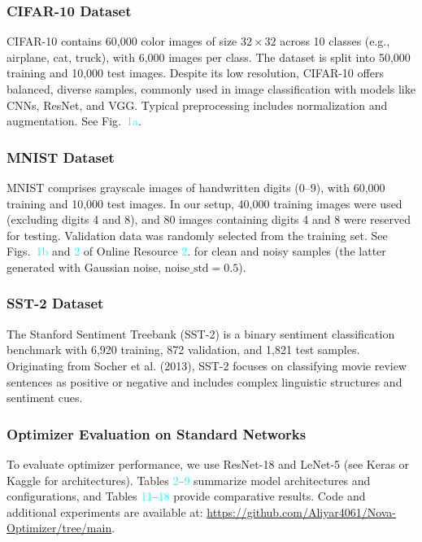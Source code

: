 \documentclass[10pt,twocolumn]{article}
\begin{document}
\subsubsection{CIFAR-10 Dataset}

CIFAR-10 contains 60,000 color images of size $32\times32$ across 10 classes (e.g., airplane, cat, truck), with 6,000 images per class. The dataset is split into 50,000 training and 10,000 test images. Despite its low resolution, CIFAR-10 offers balanced, diverse samples, commonly used in image classification with models like CNNs, ResNet, and VGG. Typical preprocessing includes normalization and augmentation. See Fig.~\textcolor{cyan}{1a}.

\subsubsection{MNIST Dataset}

MNIST comprises grayscale images of handwritten digits (0–9), with 60,000 training and 10,000 test images. In our setup, 40,000 training images were used (excluding digits 4 and 8), and 80 images containing digits 4 and 8 were reserved for testing. Validation data was randomly selected from the training set. See Figs.~\textcolor{cyan}{1b} and \textcolor{cyan}{2} of  Online Resource \textcolor{cyan}{2}. for clean and noisy samples (the latter generated with Gaussian noise, $\text{noise\_std} = 0.5$).

\subsubsection{SST-2 Dataset}

The Stanford Sentiment Treebank (SST-2) is a binary sentiment classification benchmark with 6,920 training, 872 validation, and 1,821 test samples. Originating from Socher et al. (2013), SST-2 focuses on classifying movie review sentences as positive or negative and includes complex linguistic structures and sentiment cues.

\subsubsection{Optimizer Evaluation on Standard Networks}

To evaluate optimizer performance, we use ResNet-18 and LeNet-5 (see Keras or Kaggle for architectures). Tables \textcolor{cyan}{2}–\textcolor{cyan}{9} summarize model architectures and configurations, and  Tables \textcolor{cyan}{11}–\textcolor{cyan}{18}  provide comparative results. Code and additional experiments are available at: \url{https://github.com/Aliyar4061/Nova-Optimizer/tree/main}.
\end{document}
